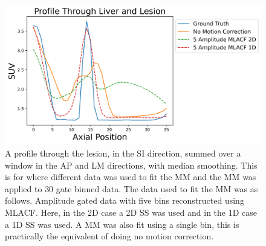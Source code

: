             \begin{figure}
                \centering
                
                \includegraphics[width=1.0\linewidth]{figures/motion_correction_2_results_2_1d_vs_2d_profile.png}
                
                \captionsetup{singlelinecheck=false}
                \caption{
                    A profile through the lesion, in the \gls{SI} direction, summed over a window in the \gls{AP} and \gls{LM} directions, with median smoothing. This is for where different data was used to fit the \gls{MM} and the \gls{MM} was applied to $30$ gate binned data. The data used to fit the \gls{MM} was as follows. Amplitude gated data with five bins reconstructed using \gls{MLACF}. Here, in the \gls{2D} case a \gls{2D} \gls{SS} was used and in the \gls{1D} case a \gls{1D} \gls{SS} was used. A \gls{MM} was also fit using a single bin, this is practically the equivalent of doing no motion correction.
                }
                
                \label{fig:evaluation_of_pet_ct_motion_correction_incorporating_motion_models_using_mlacf_and_complex_gating_schemes_results_1d_vs_2d_profile}
            \end{figure}

